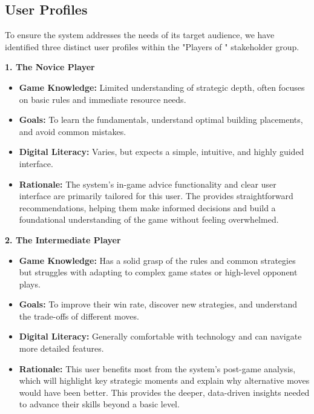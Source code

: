 \documentclass{article}
\begin{document}
\subsection{User Profiles}\label{subsec:User Profiles}
To ensure the system addresses the needs of its target audience, we have identified three distinct user profiles within the "Players of \emph{\Catan{}}" stakeholder group.

\hspace{1cm}

\noindent\textbf{1. The Novice Player}
\begin{itemize}
    \item \textbf{Game Knowledge:} Limited understanding of strategic depth, often focuses on basic rules and immediate resource needs.
    \item \textbf{Goals:} To learn the fundamentals, understand optimal building placements, and avoid common mistakes.
    \item \textbf{Digital Literacy:} Varies, but expects a simple, intuitive, and highly guided interface.
    \item \textbf{Rationale:} The system's in-game advice functionality and clear user interface are primarily tailored for this user. The \AI{} provides straightforward recommendations, helping them make informed decisions and build a foundational understanding of the game without feeling overwhelmed.
\end{itemize}

\noindent\textbf{2. The Intermediate Player}
\begin{itemize}
    \item \textbf{Game Knowledge:} Has a solid grasp of the rules and common strategies but struggles with adapting to complex game states or high-level opponent plays.
    \item \textbf{Goals:} To improve their win rate, discover new strategies, and understand the trade-offs of different moves.
    \item \textbf{Digital Literacy:} Generally comfortable with technology and can navigate more detailed features.
    \item \textbf{Rationale:} This user benefits most from the system's post-game analysis, which will highlight key strategic moments and explain why alternative moves would have been better. This provides the deeper, data-driven insights needed to advance their skills beyond a basic level.
\end{itemize}
\end{document}

